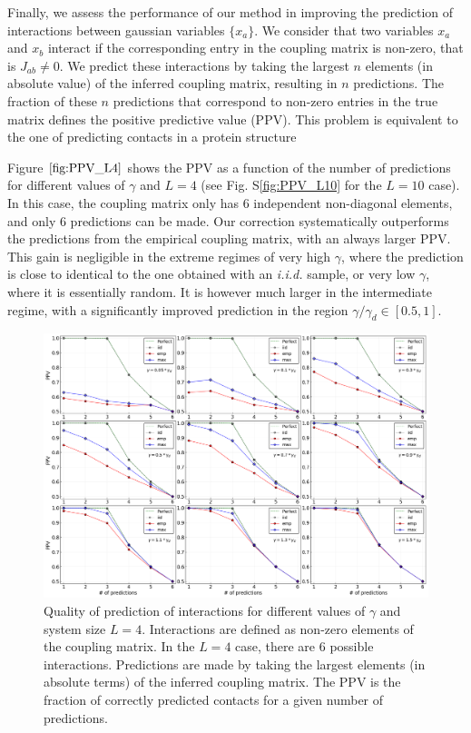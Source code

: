 \documentclass[preprint,amsmath,amssymb,superscriptaddress,showpacs,pre]{revtex4-1}
\newcommand{\sref}[1]{S\ref{#1}}
\begin{document}
Finally, we assess the performance of our method in improving the prediction of interactions between gaussian variables $\{x_a\}$. 
We consider that two variables $x_a$ and $x_b$ interact if the corresponding entry in the coupling matrix is non-zero, that is $J_{ab}\neq 0$. 
We predict these interactions by taking the largest $n$ elements (in absolute value) of the inferred coupling matrix, resulting in $n$ predictions. 
The fraction of these $n$ predictions that correspond to non-zero entries in the true matrix defines the positive predictive value (PPV). 
This problem is equivalent to the one of predicting contacts in a protein structure 

Figure $\ref{fig:PPV_L4}$ shows the PPV as a function of the number of predictions for different values of $\gamma$ and $L=4$ (see Fig. \sref{fig:PPV_L10} for the $L=10$ case). 
In this case, the coupling matrix only has $6$ independent non-diagonal elements, and only 6 predictions can be made. 
Our correction systematically outperforms the predictions from the empirical coupling matrix, with an always larger PPV. 
This gain is negligible in the extreme regimes of very high $\gamma$, where the prediction is close to identical to the one obtained with an \emph{i.i.d.} sample, or very low $\gamma$, where it is essentially random. 
It is however much larger in the intermediate regime, with a significantly improved prediction in the region $\gamma/\gamma_d\in[0.5,1]$.




\begin{figure}[!htb]
	\centering
	\includegraphics[keepaspectratio=true,width=1.0\textwidth]{Figures/PPVs_L4.png}
	\caption{Quality of prediction of interactions for  different values of $\gamma$ and system size $L=4$. Interactions are defined as non-zero elements of the coupling matrix. In the $L=4$ case, there are $6$ possible interactions. Predictions are made by taking the largest elements (in absolute terms) of the inferred coupling matrix. The PPV is the fraction of correctly predicted contacts for a given number of predictions.}
	\label{fig:PPV_L4}
\end{figure}
\end{document}
